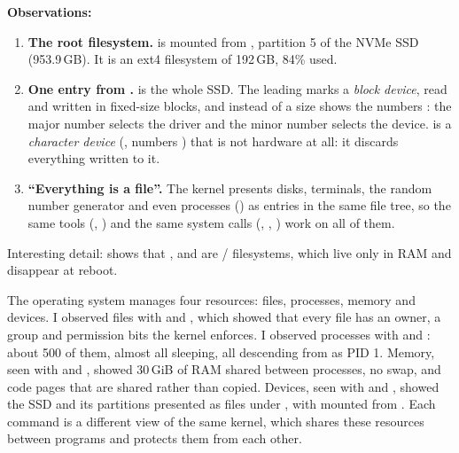 \documentclass[11pt,a4paper]{article}
\begin{document}
\textbf{Observations:}
\begin{enumerate}
  \item \textbf{The root filesystem.} \code{/} is mounted from ,
  partition 5 of the NVMe SSD  (953.9\,GB). It is an ext4 filesystem of
  192\,GB, 84\% used.
  \item \textbf{One entry from .}  is the whole SSD. The
  leading  marks a \emph{block device}, read and written in fixed-size blocks, and
  instead of a size  shows the numbers : the major number selects the
  driver and the minor number selects the device.  is a \emph{character
  device} (, numbers ) that is not hardware at all: it discards everything
  written to it.
  \item \textbf{``Everything is a file''.} The kernel presents disks, terminals, the random
  number generator and even processes () as entries in the same file tree, so the
  same tools (, ) and the same system calls (, ,
  ) work on all of them.
\end{enumerate}

Interesting detail:  shows that ,  and  are
/ filesystems, which live only in RAM and disappear at reboot.


The operating system manages four resources: files, processes, memory and devices. I observed
files with  and , which showed that every file has an owner, a group and
permission bits the kernel enforces. I observed processes with  and :
about 500 of them, almost all sleeping, all descending from  as PID 1. Memory,
seen with  and , showed 30\,GiB of RAM shared between processes, no
swap, and code pages that are shared rather than copied. Devices, seen with  and
, showed the SSD and its partitions presented as files under , with
\code{/} mounted from . Each command is a different view of the same kernel,
which shares these resources between programs and protects them from each other.
\end{document}
